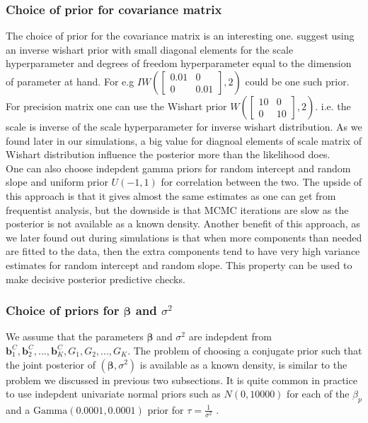 \subsubsection{Choice of prior for covariance matrix}
The choice of prior for the covariance matrix is an interesting one. \citet[pg. 260]{lesaffre_bayesian_2012} suggest using an inverse wishart prior with small diagonal elements for the scale hyperparameter and degrees of freedom hyperparameter equal to the dimension of parameter at hand. For e.g $IW(\begin{bmatrix}0.01 & 0 \\ 0 & 0.01\end{bmatrix}, 2)$ could be one such prior. For precision matrix one can use the Wishart prior $W(\begin{bmatrix}10 & 0 \\ 0 & 10\end{bmatrix}, 2)$. i.e. the scale is inverse of the scale hyperparameter for inverse wishart distribution. As we found later in our simulations, a big value for diagnoal elements of scale matrix of Wishart distribution influence the posterior more than the likelihood does.\\

One can also choose indepdent gamma priors for random intercept and random slope and uniform prior $U(-1,1)$ for correlation between the two. The upside of this approach is that it gives almost the same estimates as one can get from frequentist analysis, but the downside is that MCMC iterations are slow as the posterior is not available as a known density. Another benefit of this approach, as we later found out during simulations is that when more components than needed are fitted to the data, then the extra components tend to have very high variance estimates for random intercept and random slope. This property can be used to make decisive posterior predictive checks.

\subsubsection{Choice of priors for $\boldsymbol{\beta}$ and $\sigma^2$}
We assume that the parameters $\boldsymbol{\beta}$ and $\sigma^2$ are indepdent from $\boldsymbol{b}_1^C, \boldsymbol{b}_2^C, ..., \boldsymbol{b}_K^C, G_1, G_2, ..., G_K$. The problem of choosing a conjugate prior such that the joint posterior of $(\boldsymbol{\beta}, \sigma^2)$ is available as a known density, is similar to the problem we discussed in previous two subsections. It is quite common in practice to use indepdent univariate normal priors such as $N(0, 10000)$ for each of the $\beta_p$ and a $\text{Gamma}(0.0001, 0.0001)$ prior for $\tau = \frac 1 {\sigma^2}$ \citep[chap. 17]{gelman_data_2006}.

